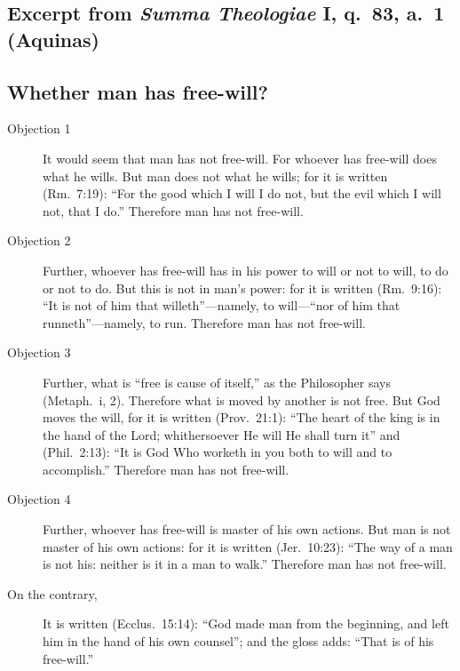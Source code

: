 \documentclass[10pt,article,twoside]{memoir}
\begin{document}
\begin{multicols}{2}
	\section{Excerpt from \emph{Summa Theologiae} I, q.~83, a.~1 (Aquinas)}
	\subsection{Whether man has free-will?}
	
	\begin{description}
		\item[Objection 1]  It would seem that man has not free-will. For whoever has free-will does what he wills. But man does not what he wills; for it is written (Rm.~7:19): ``For the good which I will I do not, but the evil which I will not, that I do.'' Therefore man has not free-will.
		\item[Objection 2] Further, whoever has free-will has in his power to will or not to will, to do or not to do. But this is not in man's power: for it is written (Rm.~9:16): ``It is not of him that willeth''---namely, to will---``nor of him that runneth''---namely, to run. Therefore man has not free-will.
		\item[Objection 3]  Further, what is ``free is cause of itself,'' as the Philosopher says (Metaph.~i, 2). Therefore what is moved by another is not free. But God moves the will, for it is written (Prov.~21:1): ``The heart of the king is in the hand of the Lord; whithersoever He will He shall turn it'' and (Phil.~2:13): ``It is God Who worketh in you both to will and to accomplish.'' Therefore man has not free-will.
		\item[Objection 4]  Further, whoever has free-will is master of his own actions. But man is not master of his own actions: for it is written (Jer.~10:23): ``The way of a man is not his: neither is it in a man to walk.'' Therefore man has not free-will.

		\item[On the contrary,] It is written (Ecclus.~15:14): ``God made man from the beginning, and left him in the hand of his own counsel''; and the gloss adds: ``That is of his free-will.''
		

\end{description}
\end{multicols}
\end{document}
